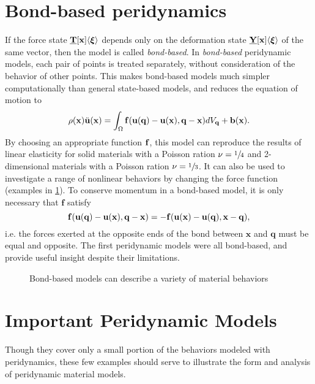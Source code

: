 \section{Bond-based peridynamics}
%
If the force state \(\vstate{T}{\mathbf{x}}{\boldsymbol{\xi}} \) depends only on the deformation state \(\vstate{Y}{\mathbf{x}}{\boldsymbol{\xi}} \) of the same vector, then the model is called \textit{bond-based}.
In \textit{bond-based} peridynamic models, each pair of points is treated separately, without consideration of the behavior of other points. 
This makes bond-based models much simpler computationally than general state-based models, and reduces the equation of motion to
%
\begin{equation}
\label{eq:PDbondEoM}
\rho(\mathbf{x})\ddot{\mathbf{u}}(\mathbf{x}) = \int_\Omega \mathit{\mathbf{f}}(\mathbf{u}(\mathbf{q})-\mathbf{u}(\mathbf{x}),\mathbf{q}-\mathbf{x}) dV_\mathbf{q}  + \mathbf{b}(\mathbf{x}).
\end{equation}
%
By choosing an appropriate function $\mathit{\mathbf{f}}$, this model can reproduce the results of linear elasticity for solid materials with a Poisson ration \(\nu=\sfrac{1}{4}\) and 2-dimensional materials with a Poisson ration \(\nu=\sfrac{1}{3}\). 
It can also be used to investigate a range of nonlinear behaviors by changing the force function (examples in \cref{fig:BondForce}). 
To conserve momentum in a bond-based model, it is only necessary that $\mathbf{f}$ satisfy
%
\begin{equation}
\label{eq:PDbondF}
 \mathit{\mathbf{f}}(\mathbf{u}(\mathbf{q})-\mathbf{u}(\mathbf{x}),\mathbf{q}-\mathbf{x})=-\mathit{\mathbf{f}}(\mathbf{u}(\mathbf{x})-\mathbf{u}(\mathbf{q}),\mathbf{x}-\mathbf{q}),
\end{equation}
%
i.e. the forces exerted at the opposite ends of the bond between $\mathbf{x}$ and $\mathbf{q}$ must be equal and opposite.
The first peridynamic models were all bond-based, and provide useful insight despite their limitations.
%
\begin{figure}[h]
  \centering
{}
\caption{Bond-based models can describe a variety of material behaviors}
\label{fig:BondForce}
\end{figure}
%

\section{Important Peridynamic Models}
Though they cover only a small portion of the behaviors modeled with peridynamics, these few examples should serve to illustrate the form and analysis of peridynamic material models.
